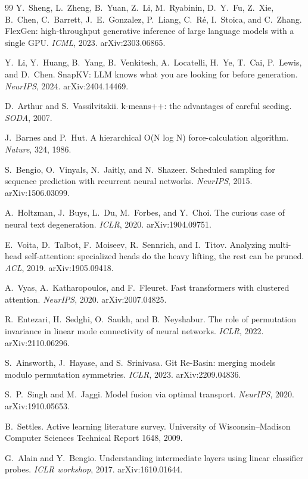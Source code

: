 \documentclass[11pt]{article}
\begin{document}
\begin{thebibliography}{99}
Y.~Sheng, L.~Zheng, B.~Yuan, Z.~Li, M.~Ryabinin, D.~Y.~Fu,
Z.~Xie, B.~Chen, C.~Barrett, J.~E.~Gonzalez, P.~Liang,
C.~R\'e, I.~Stoica, and C.~Zhang.
FlexGen: high-throughput generative inference of large language
models with a single GPU.
\emph{ICML}, 2023. arXiv:2303.06865.

Y.~Li, Y.~Huang, B.~Yang, B.~Venkitesh, A.~Locatelli, H.~Ye,
T.~Cai, P.~Lewis, and D.~Chen.
SnapKV: LLM knows what you are looking for before generation.
\emph{NeurIPS}, 2024. arXiv:2404.14469.

D.~Arthur and S.~Vassilvitskii.
k-means++: the advantages of careful seeding.
\emph{SODA}, 2007.

J.~Barnes and P.~Hut.
A hierarchical O(N log N) force-calculation algorithm.
\emph{Nature}, 324, 1986.

S.~Bengio, O.~Vinyals, N.~Jaitly, and N.~Shazeer.
Scheduled sampling for sequence prediction with recurrent neural
networks.
\emph{NeurIPS}, 2015. arXiv:1506.03099.

A.~Holtzman, J.~Buys, L.~Du, M.~Forbes, and Y.~Choi.
The curious case of neural text degeneration.
\emph{ICLR}, 2020. arXiv:1904.09751.

E.~Voita, D.~Talbot, F.~Moiseev, R.~Sennrich, and I.~Titov.
Analyzing multi-head self-attention: specialized heads do the
heavy lifting, the rest can be pruned.
\emph{ACL}, 2019. arXiv:1905.09418.

A.~Vyas, A.~Katharopoulos, and F.~Fleuret.
Fast transformers with clustered attention.
\emph{NeurIPS}, 2020. arXiv:2007.04825.

R.~Entezari, H.~Sedghi, O.~Saukh, and B.~Neyshabur.
The role of permutation invariance in linear mode connectivity
of neural networks.
\emph{ICLR}, 2022. arXiv:2110.06296.

S.~Ainsworth, J.~Hayase, and S.~Srinivasa.
Git Re-Basin: merging models modulo permutation symmetries.
\emph{ICLR}, 2023. arXiv:2209.04836.

S.~P.~Singh and M.~Jaggi.
Model fusion via optimal transport.
\emph{NeurIPS}, 2020. arXiv:1910.05653.

B.~Settles.
Active learning literature survey.
University of Wisconsin--Madison Computer Sciences Technical
Report 1648, 2009.

G.~Alain and Y.~Bengio.
Understanding intermediate layers using linear classifier
probes.
\emph{ICLR workshop}, 2017. arXiv:1610.01644.


\end{thebibliography}
\end{document}
